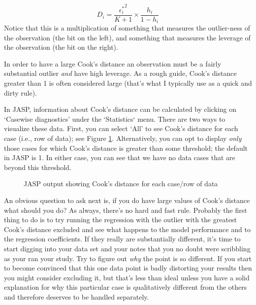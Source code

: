 \vspace{0.5cm}
\begin{mdframed}[style=MyFrame,nobreak=true]
$$
D_i = \frac{{\epsilon_i^*}^2 }{K+1} \times \frac{h_i}{1-h_i}
$$ 
Notice that this is a multiplication of something that measures the outlier-ness of the observation (the bit on the left), and something that measures the leverage of the observation (the bit on the right). 
\end{mdframed}

In order to have a large Cook's distance an observation must be a fairly substantial outlier {\it and} have high leverage. As a rough guide, Cook's distance greater than 1 is often considered large (that's what I typically use as a quick and dirty rule). 

In JASP, information about Cook's distance can be calculated by clicking on `Casewise diagnostics' under the `Statistics` menu.  There are two ways to visualize these data.  First, you can select `All' to see Cook's distance for each case (i.e., row of data); see Figure \ref{fig:reg4}.  Alternatively, you can opt to display \emph{only} those cases for which Cook's distance is greater than some threshold; the default in JASP is 1.  In either case, you can see that we have no data cases that are beyond this threshold.

\begin{figure}[!htb]
\begin{center}
\caption{JASP output showing Cook's distance for each case/row of data}
\HR
\label{fig:reg4}
\end{center}
\end{figure}


An obvious question to ask next is, if you do have large values of Cook's distance what should you do? As always, there's no hard and fast rule. Probably the first thing to do is to try running the regression with the outlier with the greatest Cook's distance excluded and see what happens to the model performance and to the regression coefficients. If they really are substantially different, it's time to start digging into your data set and your notes that you no doubt were scribbling as your ran your study. Try to figure out {\it why} the point is so different. If you start to become convinced that this one data point is badly distorting your results then you might consider excluding it, but that's less than ideal unless you have a solid explanation for why this particular case is qualitatively different from the others and therefore deserves to be handled separately.

